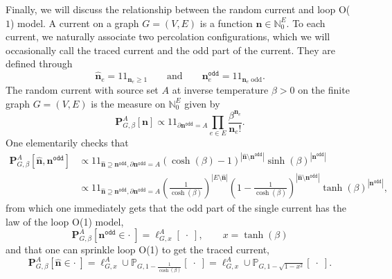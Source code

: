 \documentclass[article,11pt,reqno]{amsart}
\newcommand{\id}{1\! \!1}
\newcommand{\nn}{\mathbf{n}}
\begin{document}
Finally, we will discuss the relationship between the random current and loop O($1$) model. A current on a graph $G=(V,E)$ is a function $\mathbf{n}\in\mathbb{N}_0^E$.  To each current, we naturally associate two percolation configurations, which we will occasionally call the traced current and the odd part of the current. They are defined through 
$$
\hat{\mathbf{n}}_e=\id_{\mathbf{n}_e\geq 1} \qquad \mathrm{and}\qquad \mathbf{n}_{e}^{\mathtt{odd}}=\id_{\mathbf{n}_e\;\mathrm{odd}}.
$$
The random current with source set $A$ at inverse temperature $\beta>0$ on the finite graph $G=(V,E)$ is the measure on $\mathbb{N}_0^E$ given by
$$
\mathbf{P}^A_{G,\beta}[\mathbf{n}]\propto \id_{\partial \mathbf{n}^{\mathtt{odd}}=A}\prod_{e\in E} \frac{\beta^{\mathbf{n}_e}}{\mathbf{n}_e!}.
$$
One elementarily checks that 
\begin{align*}\mathbf{P}^A_{G,\beta}[\hat{\mathbf{n}},\mathbf{n}^{\mathtt{odd}}]&\propto\id_{\hat{\mathbf{n}}\supseteq\mathbf{n}^{\mathtt{odd}},\partial \mathbf{n}^{\mathtt{odd}}=A} (\cosh(\beta)-1)^{|\hat{\mathbf{n}}\setminus\mathbf{n}^{\mathtt{odd}}|}\sinh(\beta)^{|\mathbf{n}^{\mathtt{odd}}|} \\
&\propto \id_{\hat{\mathbf{n}}\supseteq\mathbf{n}^{\mathtt{odd}},\partial \mathbf{n}^{\mathtt{odd}}=A} \left(\frac{1}{\cosh(\beta)}\right)^{|E\setminus \hat{\nn}|}\left(1-\frac{1}{\cosh(\beta)}\right)^{|\hat{\mathbf{n}}\setminus\mathbf{n}^{\mathtt{odd}}|}\tanh(\beta)^{|\mathbf{n}^{\mathtt{odd}}|},
\end{align*}
from which one immediately gets that the odd part of the single current has the law of the loop O(1) model,
\begin{equation}\label{dd_extraction}
\mathbf{P}^A_{G,\beta}[\mathbf{n}^{\mathtt{odd}}\in \cdot \;]=\ell^A_{G,x}[\;\cdot\;], \qquad x=\tanh(\beta)
\end{equation}
and that one can sprinkle loop O(1) to get the traced current, 
\begin{equation} \label{Sprinkle_to_RC} \mathbf{P}^A_{G,\beta}[\hat{\mathbf{n}}\in\cdot\;]=\ell^A_{G,x}\cup \mathbb{P}_{G,1-\frac{1}{\cosh(\beta)}}[\;\cdot\;]=\ell^A_{G,x}\cup \mathbb{P}_{G,1-\sqrt{1-x^2}}[\;\cdot\;].
\end{equation}
\end{document}
